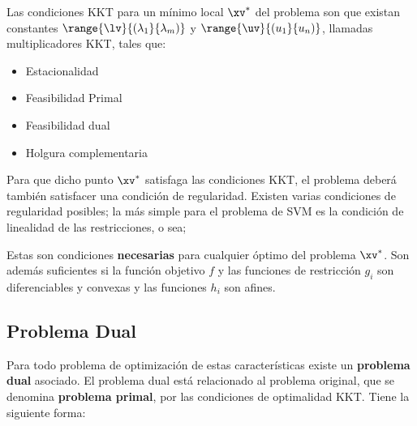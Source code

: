 
Las condiciones KKT para un mínimo local $\xv^*$ del problema son que existan constantes $\range{\lv}{(\lambda_1}{\lambda_m)}$ y $\range{\uv}{(u_1}{u_n)}$, llamadas multiplicadores KKT, tales que:

\begin{itemize}

\item Estacionalidad\\

\item Feasibilidad Primal \\

\item Feasibilidad dual\\

\item Holgura complementaria\\

\end{itemize}


Para que dicho punto $\xv^*$ satisfaga las condiciones KKT, el problema deberá también satisfacer una condición de regularidad. Existen varias condiciones de regularidad posibles; la más simple para el problema de SVM es la condición de linealidad de las restricciones, o sea;



Estas son condiciones \textbf{necesarias} para cualquier óptimo del problema $\xv^*$. Son además suficientes si la función objetivo $f$ y las funciones de restricción $g_i$ son diferenciables y convexas y las funciones $h_i$ son afines.

\subsection{Problema Dual}


Para todo problema de optimización de estas características existe un \textbf{problema dual} asociado. El problema dual está relacionado al problema original, que se denomina \textbf{problema primal}, por las condiciones de optimalidad KKT. Tiene la siguiente forma:

